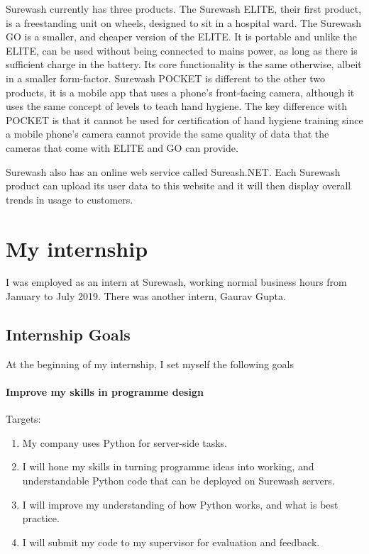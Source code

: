 Surewash currently has three products. The Surewash ELITE, their first product, is a freestanding unit on wheels, designed to sit in a hospital ward. The Surewash GO is a smaller, and cheaper version of the ELITE. It is portable and unlike the ELITE, can be used without being connected to mains power, as long as there is sufficient charge in the battery. Its core functionality is the same otherwise, albeit in a smaller form-factor. Surewash POCKET is different to the other two products, it is a mobile app that uses a phone's front-facing camera, although it uses the same concept of levels to teach hand hygiene. The key difference with POCKET is that it cannot be used for certification of hand hygiene training since a mobile phone's camera cannot provide the same quality of data that the cameras that come with ELITE and GO can provide.

Surewash also has an online web service called Sureash.NET. Each Surewash product can upload its user data to this website and it will then display overall trends in usage to customers.

\section{My internship}
I was employed as an intern at Surewash, working normal business hours from January to July 2019. There was another intern, Gaurav Gupta.
    \subsection{Internship Goals}
    At the beginning of my internship, I set myself the following goals
        \paragraph{Improve my skills in programme design}
        Targets:
        \begin{enumerate}
            \item My company uses Python for server-side tasks.
            \item I will hone my skills in turning programme ideas into working, and understandable Python code that can be deployed on Surewash servers.
            \item I will improve my understanding of how Python works, and what is best practice.
            \item I will submit my code to my supervisor for evaluation and feedback.
        \end{enumerate}
    
